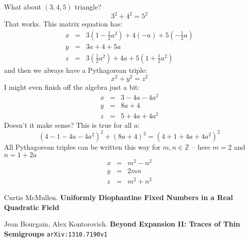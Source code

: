 \documentclass[12pt]{article}
\begin{document}
\noindent What about $(3,4,5)$ triangle? 
$$ 3^2 + 4^2 = 5^2 $$
That works.  This matrix equation has:
\begin{eqnarray}
x &=& 3(1 - \frac{1}{2}a^2)+ 4(-a)+5(- \frac{1}{2}a)    \\
y&=& 3a + 4 + 5a \\
z&=&  
3( \frac{1}{2}a^2)+ 4a + 5(1+ \frac{1}{2}a^2)
\end{eqnarray}
and then we always have a Pythagorean triple:
$$ x^2 + y^2 = z^2  $$
I might even finish off the algebra just a bit:
\begin{eqnarray}
x &=& 3-4a -4a^2   \\
y&=& 8a + 4 \\
z&=&  
5 + 4a + 4a^2
\end{eqnarray}
Doesn't it make sense?  This is true for all $a$:
$$ (4 - 1 - 4a - 4a^2)^2 + (8a + 4)^2 
= (4 + 1 +4a + 4a^2)^2 $$
All Pythagorean triples can be written this way for $m, n \in \mathbb{Z}$ -- here $m = 2$ and $n = 1 + 2a$
\begin{eqnarray}
x &=& m^2-n^2   \\
y&=& 2mn \\
z&=&  
m^2+n^2
\end{eqnarray}

\newpage

\selectfont \fontsize{12}{10}\selectfont

\begin{thebibliography}{}

\item Curtis McMullen.  \textbf{Uniformly Diophantine Fixed Numbers in a Real Quadratic Field}

\item Jean Bourgain, Alex Kontorovich.
\textbf{Beyond Expansion II: Traces of Thin Semigroups} \texttt{arXiv:1310.7190v1}

\end{thebibliography}
\end{document}
